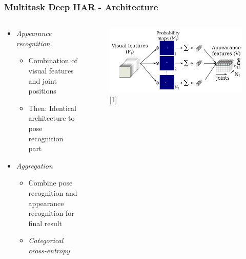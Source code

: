 \documentclass[9pt]{beamer}
\providecommand{\sourcefix}[1]{\\ \footnotesize \tugreen{Source:} [#1]}
\newenvironment{myframe}[1][]{%
\begin{frame}%
\frametitle{#1}
\setcounter{footnote}{0}


}{%
\end{frame}%
}
\begin{document}
\begin{myframe}[Multitask Deep HAR - Architecture]
	\begin{columns}[T]
        \begin{column}{.45\textwidth}
            \begin{itemize}
                \item \textit{Appearance recognition}
                \begin{itemize}
                    \item Combination of visual features and joint positions
                    \item Then: Identical architecture to pose recognition part
                \end{itemize}
                \item \textit{Aggregation}
                \begin{itemize}
                    \item Combine pose recognition and appearance recognition for final result
                    \item \textit{Categorical cross-entropy}
                \end{itemize}
            \end{itemize}
        \end{column}
        \begin{column}{.45\textwidth}
            \begin{figure}
                \includegraphics[width=.99\textwidth]{appearance-features.png}
                \sourcefix{1}
            \end{figure}
        \end{column}
	\end{columns}
\end{myframe}
\end{document}
